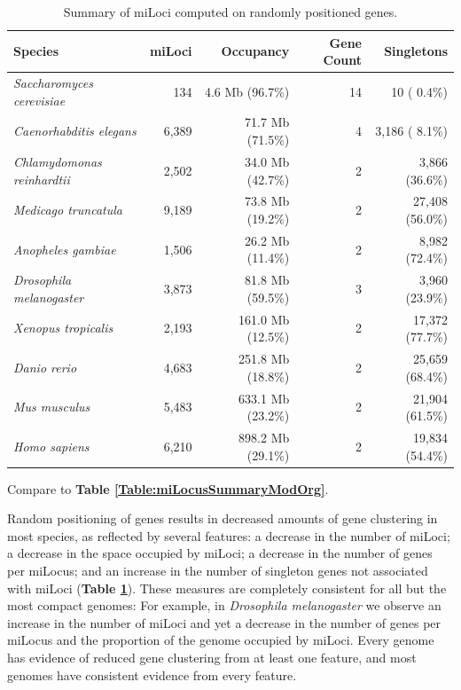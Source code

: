 \begin{table}[h]
\small
\caption{Summary of miLoci computed on randomly positioned genes.}
\label{Table:miLocusSummaryShuffled}
\begin{tabularx}{\textwidth}{lrrrr}
\hline
Species                                &               miLoci &            Occupancy &           Gene Count &           Singletons  \\ \hline
\textit{Saccharomyces cerevisiae}      &                  134 &      4.6 Mb (96.7\%) &                   14 &          10 ( 0.4\%)  \\
\textit{Caenorhabditis elegans}        &                6,389 &     71.7 Mb (71.5\%) &                    4 &       3,186 ( 8.1\%)  \\
\textit{Chlamydomonas reinhardtii}     &                2,502 &     34.0 Mb (42.7\%) &                    2 &       3,866 (36.6\%)  \\
\textit{Medicago truncatula}           &                9,189 &     73.8 Mb (19.2\%) &                    2 &      27,408 (56.0\%)  \\
\textit{Anopheles gambiae}             &                1,506 &     26.2 Mb (11.4\%) &                    2 &       8,982 (72.4\%)  \\
\textit{Drosophila melanogaster}       &                3,873 &     81.8 Mb (59.5\%) &                    3 &       3,960 (23.9\%)  \\
\textit{Xenopus tropicalis}            &                2,193 &    161.0 Mb (12.5\%) &                    2 &      17,372 (77.7\%)  \\
\textit{Danio rerio}                   &                4,683 &    251.8 Mb (18.8\%) &                    2 &      25,659 (68.4\%)  \\
\textit{Mus musculus}                  &                5,483 &    633.1 Mb (23.2\%) &                    2 &      21,904 (61.5\%)  \\
\textit{Homo sapiens}                  &                6,210 &    898.2 Mb (29.1\%) &                    2 &      19,834 (54.4\%)  \\ \hline
\end{tabularx}
\raggedright
{\scriptsize
Compare to \textbf{Table \ref{Table:miLocusSummaryModOrg}}.
}
\end{table}

Random positioning of genes results in decreased amounts of gene clustering in most species, as reflected by several features: a decrease in the number of miLoci; a decrease in the space occupied by miLoci; a decrease in the number of genes per miLocus; and an increase in the number of singleton genes not associated with miLoci (\textbf{Table \ref{Table:miLocusSummaryShuffled}}).
These measures are completely consistent for all but the most compact genomes:
For example, in \textit{Drosophila melanogaster} we observe an increase in the number of miLoci and yet a decrease in the number of genes per miLocus and the proportion of the genome occupied by miLoci.
Every genome has evidence of reduced gene clustering from at least one feature, and most genomes have consistent evidence from every feature.

